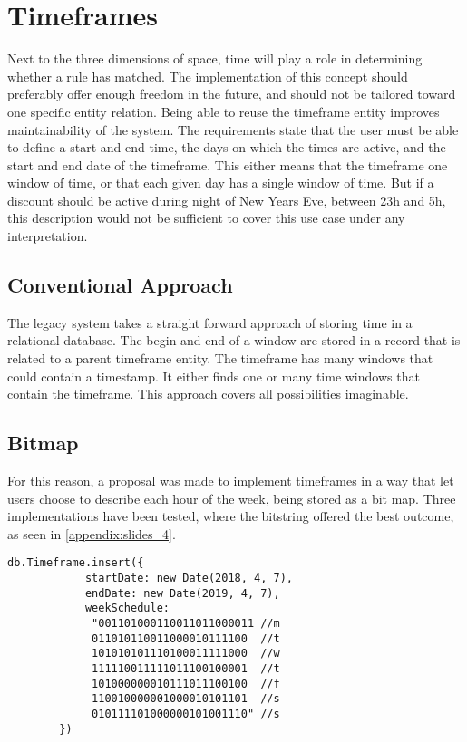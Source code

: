 \section{Timeframes}
Next to the three dimensions of space, time will play a role in determining whether a rule has matched. The implementation of this concept should preferably offer enough freedom in the future, and should not be tailored toward one specific entity relation. Being able to reuse the timeframe entity improves maintainability of the system. The requirements state that the user must be able to define a start and end time, the days on which the times are active, and the start and end date of the timeframe. This either means that the timeframe one window of time, or that each given day has a single window of time. But if a discount should be active during night of New Years Eve, between 23h and 5h, this description would not be sufficient to cover this use case under any interpretation.

\subsection{Conventional Approach}
The legacy system takes a straight forward approach of storing time in a relational database. The begin and end of a window are stored in a record that is related to a parent timeframe entity. The timeframe has many windows that could contain a timestamp. It either finds one or many time windows that contain the timeframe. This approach covers all possibilities imaginable.

\subsection{Bitmap}
For this reason, a proposal was made to implement timeframes in a way that let users choose to describe each hour of the week, being stored as a bit map. Three implementations have been tested, where the bitstring offered the best outcome, as seen in \ref{appendix:slides_4}.

\noindent\begin{minipage}{.45\textwidth}
	\begin{lstlisting}[caption={Improved timeframe.}, label={lst:new-timeframe}]
		db.Timeframe.insert({
			startDate: new Date(2018, 4, 7),
			endDate: new Date(2019, 4, 7),
			weekSchedule:
			 "001101000110011011000011 //m
			 011010110011000010111100  //t
			 101010101110100011111000  //w
			 111110011111011100100001  //t
			 101000000010111011100100  //f
			 110010000001000010101101  //s
			 010111101000000101001110" //s
		})
	\end{lstlisting}
\end{minipage}

